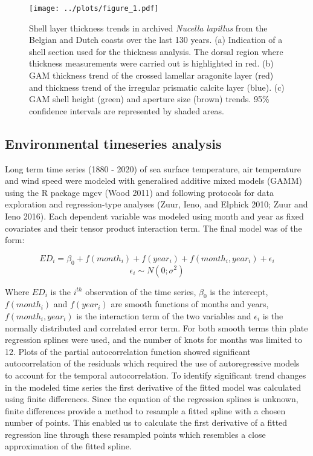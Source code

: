 \documentclass[smallextended]{svjour3}       %
\begin{document}
\begin{figure}
\centering
\texttt{[image: ../plots/figure\_1.pdf]}
\caption{Shell layer thickness trends in archived \emph{Nucella
lapillus} from the Belgian and Dutch coasts over the last 130 years. (a)
Indication of a shell section used for the thickness analysis. The
dorsal region where thickness measurements were carried out is
highlighted in red. (b) GAM thickness trend of the crossed lamellar
aragonite layer (red) and thickness trend of the irregular prismatic
calcite layer (blue). (c) GAM shell height (green) and aperture size
(brown) trends. 95\% confidence intervals are represented by shaded
areas.}
\end{figure}

\hypertarget{environmental-timeseries-analysis}{%
\subsection{Environmental timeseries
analysis}\label{environmental-timeseries-analysis}}

Long term time series (1880 - 2020) of sea surface temperature, air
temperature and wind speed were modeled with generalised additive mixed
models (GAMM) using the R package mgcv (Wood 2011) and following
protocols for data exploration and regression-type analyses (Zuur, Ieno,
and Elphick 2010; Zuur and Ieno 2016). Each dependent variable was
modeled using month and year as fixed covariates and their tensor
product interaction term. The final model was of the form:

\[
ED_i = \beta_0 + f(month_i) + f(year_i) + f(month_i, year_i) + \epsilon_i
\] \[
\epsilon_i \sim N(0; \sigma^2)
\]

Where \(ED_i\) is the \(i^{th}\) observation of the time series,
\(\beta_0\) is the intercept, \(f(month_i)\) and \(f(year_i)\) are
smooth functions of months and years, \(f(month_i, year_i)\) is the
interaction term of the two variables and \(\epsilon_i\) is the normally
distributed and correlated error term. For both smooth terms thin plate
regression splines were used, and the number of knots for months was
limited to 12. Plots of the partial autocorrelation function showed
significant autocorrelation of the residuals which required the use of
autoregressive models to account for the temporal autocorrelation. To
identify significant trend changes in the modeled time series the first
derivative of the fitted model was calculated using finite differences.
Since the equation of the regression splines is unknown, finite
differences provide a method to resample a fitted spline with a chosen
number of points. This enabled us to calculate the first derivative of a
fitted regression line through these resampled points which resembles a
close approximation of the fitted spline.
\end{document}
